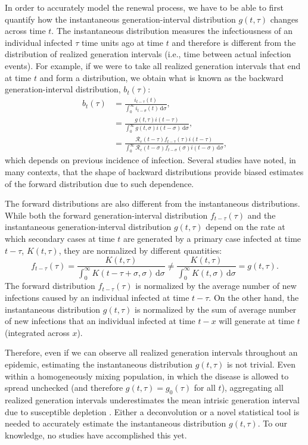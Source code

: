 \documentclass[12pt]{article}
\newcommand{\Rx}[1]{\ensuremath{{\mathcal R}_{#1}}\xspace}
\newcommand{\Rc}{\Rx{\mathrm{c}}}
\newcommand{\dd}[1]{\ensuremath{\, \mathrm{d}#1}}
\newcommand{\dsigma}{\dd{\sigma}}
\begin{document}
In order to accurately model the renewal process, we have to be able to first quantify how the instantaneous generation-interval distribution $g(t, \tau)$ changes across time $t$.
The instantaneous distribution measures the infectiousness of an individual infected $\tau$ time units ago at time $t$ and therefore is different from the distribution of realized generation intervals (i.e., time between actual infection events).
For example, if we were to take all realized generation intervals that end at time $t$ and form a distribution, we obtain what is known as the backward generation-interval distribution, $b_t(\tau)$:
\begin{align}
b_t(\tau) &= \frac{i_{t-\tau}(t)}{\int_0^\infty i_{t-\sigma}(t) \dsigma},\label{eq:backward}\\
&= \frac{g(t,\tau) i(t-\tau)}{\int_0^\infty g(t,\sigma) i(t-\sigma) \dsigma},\\
&= \frac{\Rc(t-\tau) f_{t-\tau}(\tau) i(t-\tau)}{\int_0^\infty \Rc(t-\sigma) f_{t-\sigma}(\sigma) i(t-\sigma) \dsigma},
\end{align}
which depends on previous incidence of infection.
Several studies have noted, in many contexts, that the shape of backward distributions provide biased estimates of the forward distribution due to such dependence.

The forward distributions are also different from the instantaneous distributions.
While both the forward generation-interval distribution $f_{t-\tau}(\tau)$ and the instantaneous generation-interval distribution $g(t, \tau)$ depend on the rate at which secondary cases at time $t$ are generated by a primary case infected at time $t-\tau$, $K(t, \tau)$, they are normalized by different quantities:
\begin{equation}
f_{t-\tau}(\tau) = \frac{K(t,\tau)}{\int_0^\infty K(t-\tau+\sigma,\sigma) \dsigma} \neq \frac{K(t,\tau)}{\int_0^\infty K(t,\sigma) \dsigma} = g(t, \tau).
\end{equation}
The forward distribution $f_{t-\tau}(\tau)$ is normalized by the average number of new infections caused by an individual infected at time $t-\tau$.
On the other hand, the instantaneous distribution $g(t, \tau)$ is normalized by the sum of average number of new infections that an individual infected at time $t-x$ will generate at time $t$ (integrated across $x$).

Therefore, even if we can observe all realized generation intervals throughout an epidemic, estimating the instantaneous distribution $g(t, \tau)$ is not trivial.
Even within a homogeneously mixing population, in which the disease is allowed to spread unchecked (and therefore $g(t, \tau) = g_0(\tau)$ for all $t$), aggregating all realized generation intervals underestimates the mean intrisic generation interval due to susceptible depletion \citep{park2020inferring}.
Either a deconvolution or a novel statistical tool is needed to accurately estimate the instantaneous distribution $g(t, \tau)$.
To our knowledge, no studies have accomplished this yet.
\end{document}

